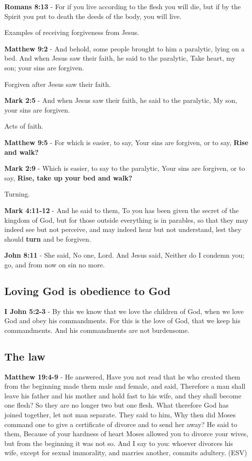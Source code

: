 \documentclass[11pt]{article}
\begin{document}
\textbf{Romans 8:13} - For if you live according to the flesh you will die, but if by the Spirit you put to death the deeds of the body, you will live.

Examples of receiving forgiveness from Jesus.

\textbf{Matthew 9:2} - And behold, some people brought to him a paralytic, lying on a bed. And when Jesus saw their faith, he said to the paralytic, Take heart, my son; your sins are forgiven.

Forgiven after Jesus saw their faith.

\textbf{Mark 2:5} - And when Jesus saw their faith, he said to the paralytic, My son, your sins are forgiven.

Acts of faith.

\textbf{Matthew 9:5} - For which is easier, to say, Your sins are forgiven, or to say, \textbf{Rise and walk?}

\textbf{Mark 2:9} - Which is easier, to say to the paralytic, Your sins are forgiven, or to say, \textbf{Rise, take up your bed and walk?}

Turning.

\textbf{Mark 4:11-12} - And he said to them, To you has been given the secret of the kingdom of God, but for those outside everything is in parables, so that they may indeed see but not perceive, and may indeed hear but not understand, lest they should \textbf{turn} and be forgiven.

\textbf{John 8:11} - She said, No one, Lord. And Jesus said, Neither do I condemn you; go, and from now on sin no more.

\subsection{Loving God is obedience to God}
\label{sec:org897c917}
\textbf{I John 5:2-3} - By this we know that we love the children of God, when we love God and obey his commandments. For this is the love of God, that we keep his commandments. And his commandments are not burdensome.

\subsection{The law}
\label{sec:org93db6ed}

\textbf{Matthew 19:4-9} - He answered, Have you not read that he who created them from the beginning made them male and female, and said, Therefore a man shall leave his father and his mother and hold fast to his wife, and they shall become one flesh? So they are no longer two but one flesh. What therefore God has joined together, let not man separate. They said to him, Why then did Moses command one to give a certificate of divorce and to send her away? He said to them, Because of your hardness of heart Moses allowed you to divorce your wives, but from the beginning it was not so. And I say to you: whoever divorces his wife, except for sexual immorality, and marries another, commits adultery. (ESV)
\end{document}

